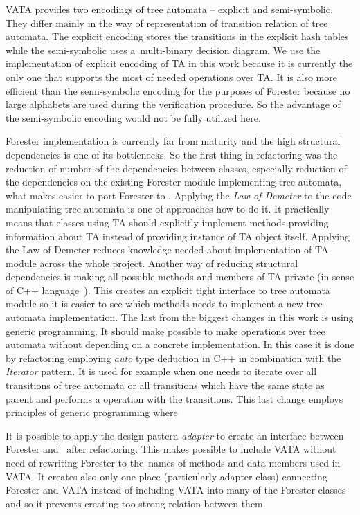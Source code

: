 \documentclass[fleqn,11pt]{ExcelAtFIT} %
\begin{document}
VATA provides two encodings of tree automata -- explicit and semi-symbolic.
They differ mainly in the way of representation of transition relation of tree automata.
The explicit encoding stores the transitions in the explicit hash tables while the semi-symbolic
uses a~multi-binary decision diagram.
We use the implementation of explicit encoding of TA in this work because
it is currently the only one that supports the most of needed operations over TA.
It is also more efficient than the semi-symbolic encoding for the purposes of Forester because no large alphabets are used during the verification procedure.
So the advantage of the semi-symbolic encoding would not be fully utilized here.

Forester implementation is currently far from maturity and
the high structural dependencies is one of its bottlenecks.
So the first thing in refactoring was the reduction of number of the dependencies between classes,
especially reduction of the dependencies on the existing Forester module implementing tree automata,
what makes easier to port Forester to \vata.
Applying the \emph{Law of Demeter} \cite{lod89} to the code manipulating tree automata is one of approaches how to do it. 
It practically means that classes using TA should explicitly implement methods providing information about TA instead of providing instance of TA object itself.
Applying the Law of Demeter reduces knowledge needed about implementation of TA module across the whole project.
Another way of reducing structural dependencies is making all possible methods and members of TA private (in sense of C++ language~\cite{stroustrup13}).
This creates an explicit tight interface to tree automata module so it is easier to see which methods needs to implement
a new tree automata implementation.
The last from the biggest changes in this work is using generic programming.
It should make possible to make operations over tree automata without depending on a concrete implementation.
In this case it is done by refactoring employing \emph{auto} type deduction in C++ in combination
with the \emph{Iterator} pattern.
It is used for example when one needs to iterate over all transitions of tree automata or all transitions which
have the same state as parent and performs a operation with the transitions.
This last change employs principles of generic programming where

It is possible to apply the design pattern \emph{adapter} \cite{gamma95} to create
an interface between Forester and \vata\ after refactoring.
This makes possible to include VATA without need of rewriting
Forester to the~names of methods and data members used in VATA.
It creates also only one place (particularly adapter class) connecting Forester and VATA instead of
including VATA into many of the Forester classes and so it prevents creating too strong relation between them.
\end{document}
